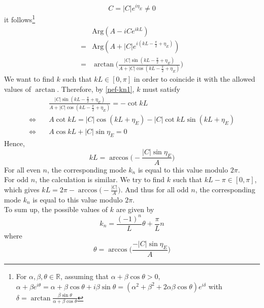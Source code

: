 \begin{equation*}
C = |C| e^{i\eta_E} \neq 0 
\end{equation*}
it follows\footnote{
For $\alpha, \beta, \theta \in \mathbb{R}$, assuming that $\alpha + \beta \cos \theta > 0$, $\alpha + \beta e^{i \theta} = \alpha + \beta \cos \theta + i\beta \sin \theta = (\alpha^2 + \beta^2 + 2\alpha \beta \cos \theta) e^{i \delta}$ with $\delta = \arctan \frac{\beta\sin\theta}{\alpha + \beta\cos\theta}$  
} 
\begin{equation}
\begin{split}
&\textrm{Arg}(A - iC e^{ikL}) \\
= &\textrm{Arg}(A + |C| e^{i(kL - \frac{\pi}{2} + \eta_E)}) \\
= & \arctan \bigg( \frac{|C| \sin(kL - \frac{\pi}{2} + \eta_E)}{A + | C| \cos(kL - \frac{\pi}{2} + \eta_E) }\bigg)
\end{split}
\end{equation}
We want to find $k$ such that $kL \in [0, \pi]$ in order to coincide it with the allowed values of $\arctan$.
Therefore, by \cref{nef-kn1}, $k$ must satisfy
\begin{equation}\label{nef-arctan}
\begin{split}
& \frac{|C| \sin(kL - \frac{\pi}{2} + \eta_E)}{A + | C| \cos(kL - \frac{\pi}{2} + \eta_E) } =  - \cot kL  \\
\Leftrightarrow \quad & A \cot kL = |C| \cos(kL + \eta_E) - |C| \cot kL \sin(kL + \eta_E)  \\
%
\Leftrightarrow\quad &
A \cos kL + |C| \sin\eta_E= 0
\end{split}
\end{equation}
Hence,
\begin{equation*}
kL = \arccos \big(-\frac{|C|\sin\eta_E}{A}\big)
\end{equation*}
For all even $n$, the corresponding mode $k_n$ is equal to this value modulo $2 \pi$. \\
For odd $n$, the calculation is similar.
We try to find $k$ such that $kL - \pi \in [0, \pi]$, which gives $kL = 2\pi - \arccos \big(-\frac{|C|}{A}\big)$. 
And thus for all odd $n$, the corresponding mode $k_n$ is equal to this value modulo $2 \pi$.\\
To sum up, the possible values of $k$ are given by
\begin{equation*}
k_{n} = \frac{(-1)^n}{L}\theta  + \frac{\pi}{L}n 
\end{equation*}
where
\begin{equation*}
\theta = \arccos\bigg( \frac{-|C| \sin \eta_E}{A} \bigg)
\end{equation*}
